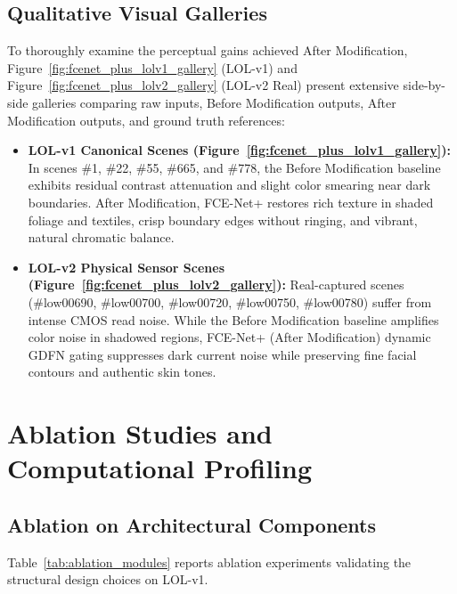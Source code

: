 \documentclass[10pt,twocolumn,letterpaper]{article}
\begin{document}
\subsection{Qualitative Visual Galleries}
To thoroughly examine the perceptual gains achieved After Modification, Figure~\ref{fig:fcenet_plus_lolv1_gallery} (LOL-v1) and Figure~\ref{fig:fcenet_plus_lolv2_gallery} (LOL-v2 Real) present extensive side-by-side galleries comparing raw inputs, Before Modification outputs, After Modification outputs, and ground truth references:
\begin{itemize}
    \item \textbf{LOL-v1 Canonical Scenes (Figure~\ref{fig:fcenet_plus_lolv1_gallery}):} In scenes \#1, \#22, \#55, \#665, and \#778, the Before Modification baseline exhibits residual contrast attenuation and slight color smearing near dark boundaries. After Modification, FCE-Net+ restores rich texture in shaded foliage and textiles, crisp boundary edges without ringing, and vibrant, natural chromatic balance.
    \item \textbf{LOL-v2 Physical Sensor Scenes (Figure~\ref{fig:fcenet_plus_lolv2_gallery}):} Real-captured scenes (\#low00690, \#low00700, \#low00720, \#low00750, \#low00780) suffer from intense CMOS read noise. While the Before Modification baseline amplifies color noise in shadowed regions, FCE-Net+ (After Modification) dynamic GDFN gating suppresses dark current noise while preserving fine facial contours and authentic skin tones.
\end{itemize}

\section{Ablation Studies and Computational Profiling}

\subsection{Ablation on Architectural Components}
Table~\ref{tab:ablation_modules} reports ablation experiments validating the structural design choices on LOL-v1.
\end{document}
